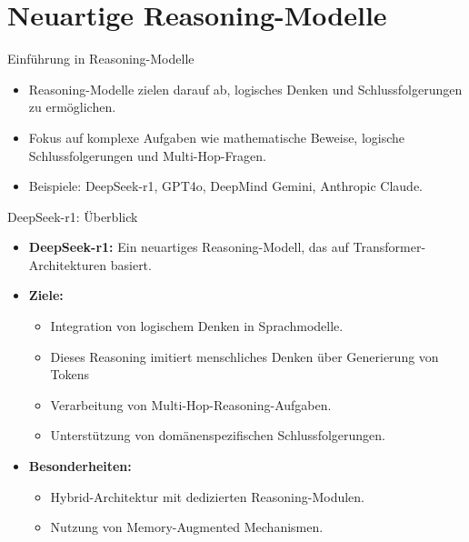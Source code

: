 \documentclass[aspectratio=1610, xcolor=dvipsnames, 9pt]{beamer}
\begin{document}
\section{Neuartige Reasoning-Modelle}

\begin{frame}{Einführung in Reasoning-Modelle}
  \begin{itemize}
    \item Reasoning-Modelle zielen darauf ab, logisches Denken und Schlussfolgerungen zu ermöglichen.
    \item Fokus auf komplexe Aufgaben wie mathematische Beweise, logische Schlussfolgerungen und Multi-Hop-Fragen.
    \item Beispiele: DeepSeek-r1, GPT4o, DeepMind Gemini, Anthropic Claude.
  \end{itemize}
\end{frame}

\begin{frame}{DeepSeek-r1: Überblick}
  \begin{itemize}
    \item \textbf{DeepSeek-r1:} Ein neuartiges Reasoning-Modell, das auf Transformer-Architekturen basiert.
    \item \textbf{Ziele:}
      \begin{itemize}
        \item Integration von logischem Denken in Sprachmodelle.
        \item Dieses Reasoning imitiert menschliches Denken über Generierung von Tokens
        \item Verarbeitung von Multi-Hop-Reasoning-Aufgaben.
        \item Unterstützung von domänenspezifischen Schlussfolgerungen.
      \end{itemize}
    \item \textbf{Besonderheiten:}
      \begin{itemize}
        \item Hybrid-Architektur mit dedizierten Reasoning-Modulen.
        \item Nutzung von Memory-Augmented Mechanismen.
      \end{itemize}
  \end{itemize}
\end{frame}
\end{document}
